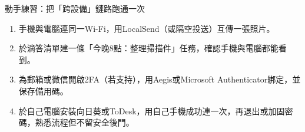 \begin{tcbpractice}{動手練習：把「跨設備」鏈路跑通一次}
\begin{enumerate}
  \item 手機與電腦連同一Wi-Fi，用LocalSend（或隔空投送）互傳一張照片。
  \item 於滴答清單建一條「今晚8點：整理掃描件」任務，確認手機與電腦都能看到。
  \item 為郵箱或微信開啟2FA（若支持），用Aegis或Microsoft Authenticator綁定，並保存備用碼。
  \item 於自己電腦安裝向日葵或ToDesk，用自己手機成功連一次，再退出或加固密碼，熟悉流程但不留安全後門。
\end{enumerate}

\end{tcbpractice}
